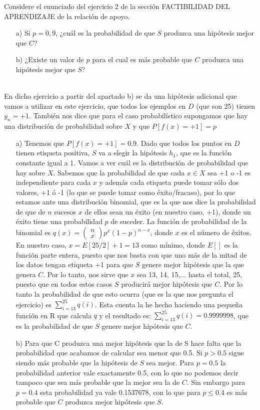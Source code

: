 \documentclass[12pt]{article}
\theoremstyle{definition}
\begin{document}
\begin{pregunta}
Considere el enunciado del ejercicio 2 de la sección FACTIBILIDAD DEL APRENDIZAJE de la relación de apoyo.
\begin{enumerate}
\item[a)] Si $p=0,9$, ¿cuál es la probabilidad de que $S$ produzca una hipótesis mejor que $C$?
\item[b)] ¿Existe un valor de $p$ para el cual es más probable que $C$ produzca una hipótesis mejor que $S$?
\end{enumerate}
\textit{ }\\

En dicho ejercicio a partir del apartado b) se da una hipótesis adicional que vamos a utilizar en este ejercicio, que todos los ejemplos en $D$ (que son 25) tienen $y_n=+1$. También nos dice que para el caso probabilístico supongamos que hay una distribución de probabilidad sobre $X$ y que $P[f(x)=+1] = p$
\begin{enumerate}
\item[a)] Tenemos que $P[f(x) = +1]=0.9$. Dado que todos los puntos en $D$ tienen etiqueta positiva, $S$ va a elegir la hipótesis $h_1$, que es la función constante igual a 1. Vamos a ver cuál es la distribución de probabilidad que hay sobre $X$. Sabemos que la probabilidad de que cada $x \in X$ sea +1 o -1 es independiente para cada $x$ y además cada etiqueta puede tomar sólo dos valores, +1 ó -1 (lo que se puede tomar como éxito/fracaso), por lo que estamos ante una distribución binomial, que es la que nos dice la probabilidad de que de $n$ sucesos $x$ de ellos sean un éxito (en nuestro caso, +1), donde un éxito tiene una probabilidad $p$ de suceder. La función de probabilidad de la binomial es $q(x) = \left( \begin{array}{c} n \\ x \end{array} \right) p^x(1-p)^{n-x}$, donde $x$ es el número de éxitos. En nuestro caso, $x=E[25/2] +1=13$ como mínimo, donde $E[]$ es la función parte entera, puesto que nos basta con que uno más de la mitad de los datos tengan etiqueta +1 para que $S$ genere mejor hipótesis que la que genera $C$. Por lo tanto, nos sirve que $x$ sea 13, 14, 15,... hasta el total, 25, puesto que en todos estos casos $S$ producirá mejor hipótesis que $C$. Por lo tanto la probabilidad de que esto ocurra (que es la que nos pregunta el ejercicio) es $\sum_{i=13}^{25} q(i)$. Esta cuenta la he hecho haciendo una pequeña función en R que calcula $q$ y el resultado es: $\sum_{i=13}^{25} q(i) = 0.9999998$, que es la probabilidad de que $S$ genere mejor hipótesis que $C$.
\item[b)] Para que C produzca una mejor hipótesis que la de S hace falta que la probabilidad que acabamos de calcular sea menor que 0.5. Si $p>0.5$ sigue siendo más probable que la hipótesis de $S$ sea mejor. Para $p=0.5$ la probabilidad anterior vale exactamente 0.5, con lo que no podemos decir tampoco que sea más probable que la mejor sea la de $C$. Sin embargo para $p=0.4$ esta probabilidad ya vale 0.1537678, con lo que para $p\leq0.4$ es más probable que $C$ produzca mejor hipótesis que $S$.


\end{enumerate}
\end{pregunta}
\end{document}
